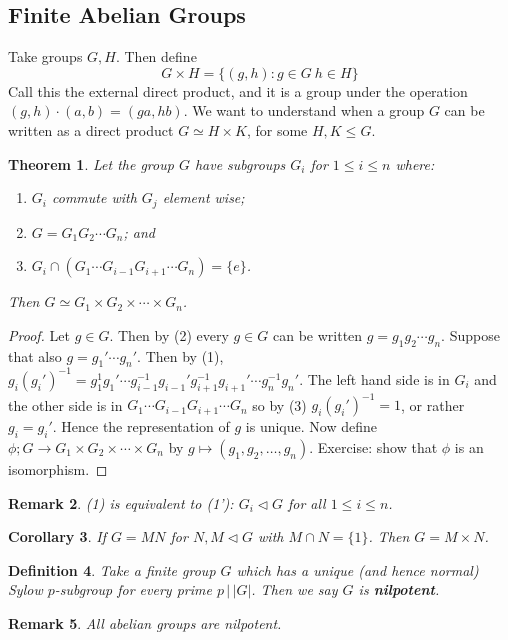 \documentclass[a4paper,10pt]{article}
\newtheorem{thm}{Theorem}
\newtheorem{Def}[thm]{Definition}
\newtheorem{Cor}[thm]{Corollary}
\newtheorem{rem}[thm]{Remark}
\begin{document}
\subsection{Finite Abelian Groups}

Take groups $G,H$. Then define
\[ G \times H = \{ (g ,h) : g \in G \ h \in H \} \]
Call this the external direct product, and it is a group under the operation $(g,h) \cdot (a,b) = (ga, hb)$. We want to understand when a group $G$ can be written as a direct product $G \simeq H \times K$, for some $H, K \leq G$.  

\begin{thm}
Let the group $G$ have subgroups $G_i$ for $1 \leq i \leq n$ where:
\begin{enumerate}
\item $G_i$ commute with $G_j$ element wise;
\item $G = G_1 G_2 \cdots G_n$; and
\item $G_i \cap (G_1 \cdots G_{i-1}G_{i+1} \cdots G_n) = \{e\}$.
\end{enumerate}
Then $G \simeq G_1 \times G_2 \times \cdots \times G_n$. 
\end{thm}

\begin{proof}
Let $g \in G$. Then by (2) every $g \in G$ can be written $g = g_1 g_2 \cdots g_n$. Suppose that also $g = g_1 ' \cdots g_n '$. Then by (1), $g_i  (g_i')^{-1} = g_1^{1} g_1' \cdots g_{i-1}^{-1} g_{i-1}' g_{i+1}^{-1} g_{i+1}' \cdots g_n^{-1} g_n'$. The left hand side is in $G_i$ and the other side is in $G_1 \cdots G_{i-1}G_{i+1} \cdots G_n$ so by (3) $g_i (g_i')^{-1} = 1$, or rather $g_i = g_i '$. Hence the representation of $g$ is unique. Now define $\phi ; G \rightarrow G_1 \times G_2 \times \cdots \times G_n$ by $g \mapsto (g_1, g_2, \dots, g_n)$. Exercise: show that $\phi$ is an isomorphism. 
\end{proof}
\begin{rem}
(1) is equivalent to (1'): $G_i \triangleleft G$ for all $1 \leq i \leq n$. 
\end{rem}

\begin{Cor}
If $G = MN$ for $N, M \triangleleft G$ with $M \cap N = \{1\}$. Then $G = M \times N$. 
\end{Cor}

\begin{Def}
Take a finite group $G$ which has a unique (and hence normal) Sylow $p$-subgroup for every prime $p \, \big| \, |G|$. Then we say $G$ is \textbf{nilpotent}. 
\end{Def}
\begin{rem}
All abelian groups are nilpotent.
\end{rem}
\end{document}
